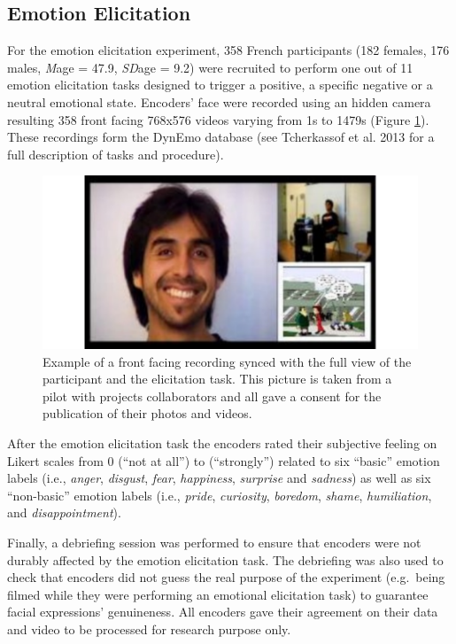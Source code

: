 \documentclass[conference,final,]{IEEEtran}
\makeatletter
\def\maxwidth{\ifdim\Gin@nat@width>\linewidth\linewidth
\else\Gin@nat@width\fi}
\let\Oldincludegraphics\includegraphics
\renewcommand{\includegraphics}[1]{\Oldincludegraphics[width=\maxwidth]{#1}}
\makeatother
\begin{document}
\hypertarget{emotion-elicitation}{%
\subsection{Emotion Elicitation}\label{emotion-elicitation}}

For the emotion elicitation experiment, 358 French participants (182
females, 176 males, \emph{M}age = 47.9, \emph{SD}age = 9.2) were
recruited to perform one out of 11 emotion elicitation tasks designed to
trigger a positive, a specific negative or a neutral emotional state.
Encoders' face were recorded using an hidden camera resulting 358 front
facing 768x576 videos varying from 1s to 1479s (Figure
\ref{fig:dynemo_img}). These recordings form the DynEmo database (see
Tcherkassof et al. 2013 for a full description of tasks and procedure).

\begin{figure}
\centering
\includegraphics{ACII_2019_paper_files/figure-latex/dynemo_img-1.pdf}
\caption{\label{fig:dynemo_img}Example of a front facing recording
synced with the full view of the participant and the elicitation task.
This picture is taken from a pilot with projects collaborators and all
gave a consent for the publication of their photos and videos.}
\end{figure}

After the emotion elicitation task the encoders rated their subjective
feeling on Likert scales from 0 (``not at all'') to 
\nolinebreak (``strongly'') related to six ``basic'' emotion labels
(i.e., \emph{anger}, \emph{disgust}, \emph{fear}, \emph{happiness},
\emph{surprise} and \emph{sadness}) as well as six ``non-basic'' emotion
labels (i.e., \emph{pride}, \emph{curiosity}, \emph{boredom},
\emph{shame}, \emph{humiliation}, and \emph{disappointment}).

Finally, a debriefing session was performed to ensure that encoders were
not durably affected by the emotion elicitation task. The debriefing was
also used to check that encoders did not guess the real purpose of the
experiment (e.g.~being filmed while they were performing an emotional
elicitation task) to guarantee facial expressions' genuineness. All
encoders gave their agreement on their data and video to be processed
for research purpose only.
\end{document}
